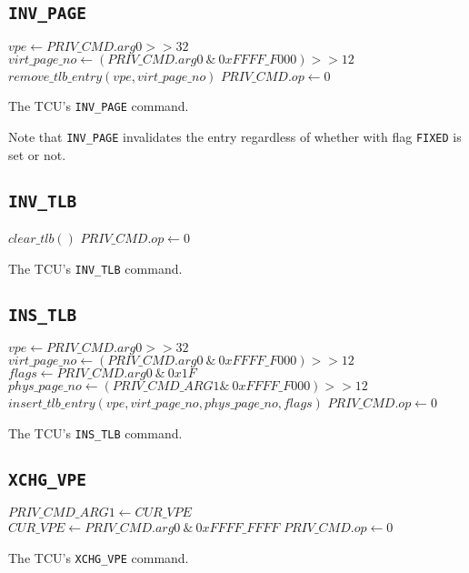 \subsection{\texttt{INV\_PAGE}}

\begin{algorithm}[H]
    $vpe \gets PRIV\_CMD.arg0 >> 32$\;
    $virt\_page\_no \gets (PRIV\_CMD.arg0\ \&\ 0xFFFF\_F000) >> 12$\;
    \BlankLine
    $remove\_tlb\_entry(vpe, virt\_page\_no)$\;
    $PRIV\_CMD.op \gets 0$\;
    \caption{The TCU's \texttt{INV\_PAGE} command.}
\end{algorithm}

\noindent Note that \texttt{INV\_PAGE} invalidates the entry regardless of whether with flag
\texttt{FIXED} is set or not.

\subsection{\texttt{INV\_TLB}}

\begin{algorithm}[H]
    $clear\_tlb()$\;
    $PRIV\_CMD.op \gets 0$\;
    \caption{The TCU's \texttt{INV\_TLB} command.}
\end{algorithm}

\subsection{\texttt{INS\_TLB}}

\begin{algorithm}[H]
    $vpe \gets PRIV\_CMD.arg0 >> 32$\;
    $virt\_page\_no \gets (PRIV\_CMD.arg0\ \&\ 0xFFFF\_F000) >> 12$\;
    $flags \gets PRIV\_CMD.arg0\ \&\ 0x1F$\;
    $phys\_page\_no \gets (PRIV\_CMD\_ARG1 \&\ 0xFFFF\_F000) >> 12$\;
    \BlankLine
    $insert\_tlb\_entry(vpe, virt\_page\_no, phys\_page\_no, flags)$\;
    $PRIV\_CMD.op \gets 0$\;
    \caption{The TCU's \texttt{INS\_TLB} command.}
\end{algorithm}
\extend{}

\subsection{\texttt{XCHG\_VPE}}

\begin{algorithm}[H]
    $PRIV\_CMD\_ARG1 \gets CUR\_VPE$\;
    $CUR\_VPE \gets PRIV\_CMD.arg0\ \&\ 0xFFFF\_FFFF$\;
    \BlankLine
    $PRIV\_CMD.op \gets 0$\;
    \caption{The TCU's \texttt{XCHG\_VPE} command.}
\end{algorithm}

